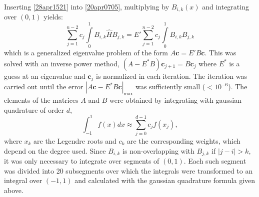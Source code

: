 \documentclass[twocolumn]{article}
\begin{document}
\begin{large}
Inserting \eqref{28apr1521} into \eqref{20apr0705}, multiplying by $B_{i,k}(x)$ and integrating over $(0,1)$ yields:
\begin{equation}
    \sum_{j=1}^{n-2}c_j\int\limits_0^1B_{i,k}\hat{H}B_{j,k} = E'\sum_{j=1}^{n-2}c_j\int\limits_0^1B_{i,k}B_{j,k}
\end{equation}
which is a generalized eigenvalue problem of the form $A\mathbf{c} = E'B\mathbf{c}$. This was solved with an inverse power method, $(A-E^*B)\mathbf{c}_{j+1} = B\mathbf{c}_j$ where $E^*$ is a guess at an eigenvalue and $\mathbf{c}_j$ is normalized in each iteration. The iteration was carried out until the error $|A\mathbf{c}-E^*B\mathbf{c}|_\text{max}$ was sufficiently small ($<10^{-6}$). The elements of the matrices $A$ and $B$  were obtained by integrating with gaussian quadrature of order $d$,
\begin{equation}
    \int_{-1}^1f(x)dx \approx\sum_{j=0}^{d-1}c_jf(x_j),
\end{equation}
where $x_k$ are the Legendre roots and $c_k$ are the corresponding weights, which depend on the degree used. Since $B_{i,k}$ is non-overlapping with $B_{j,k}$ if $|j-i|>k$, it was only necessary to integrate over segments of $(0,1)$. Each such segment was divided into 20 subsegments over which the integrals were transformed to an integral over $(-1,1)$ and calculated with the gaussian quadrature formula given above. 


\end{large}
\end{document}
